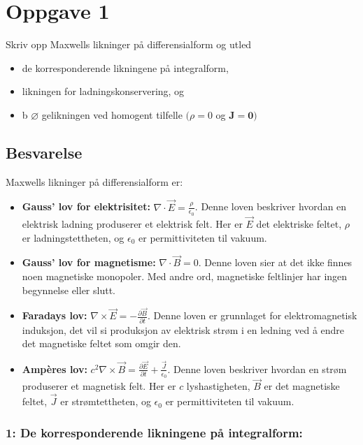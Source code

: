 \section{Oppgave 1}

Skriv opp Maxwells likninger på differensialform og utled
\begin{itemize}
    \item de korresponderende likningene på integralform,
    \item likningen for ladningskonservering, og
    \item b $ \varnothing $ gelikningen ved homogent tilfelle $ (\rho=0 $ og $ \mathbf{J}=\mathbf{0}) $
\end{itemize}

\subsection*{Besvarelse}
Maxwells likninger på differensialform er:

\begin{itemize}
    \item \textbf{Gauss' lov for elektrisitet:} $\nabla \cdot \vec{E} = \frac{\rho}{\epsilon_0}$. Denne loven beskriver hvordan en elektrisk ladning produserer et elektrisk felt. Her er $\vec{E}$ det elektriske feltet, $\rho$ er ladningstettheten, og $\epsilon_0$ er permittiviteten til vakuum.
    \item \textbf{Gauss' lov for magnetisme:} $\nabla \cdot \vec{B} = 0$. Denne loven sier at det ikke finnes noen magnetiske monopoler. Med andre ord, magnetiske feltlinjer har ingen begynnelse eller slutt.
    \item \textbf{Faradays lov:} $\nabla \times \vec{E} = -\frac{\partial \vec{B}}{\partial t}$. Denne loven er grunnlaget for elektromagnetisk induksjon, det vil si produksjon av elektrisk strøm i en ledning ved å endre det magnetiske feltet som omgir den.
    \item \textbf{Ampères lov:} $c^2\nabla \times \vec{B} =\frac{\partial \vec{E}}{\partial t} + \frac{\vec{J}}{\epsilon_0}$. Denne loven beskriver hvordan en strøm produserer et magnetisk felt. Her er $c$ lyshastigheten, $\vec{B}$ er det magnetiske feltet, $\vec{J}$ er strømtettheten, og $\epsilon_0$ er permittiviteten til vakuum.
\end{itemize}


\subsubsection*{1: De korresponderende likningene på integralform:}


